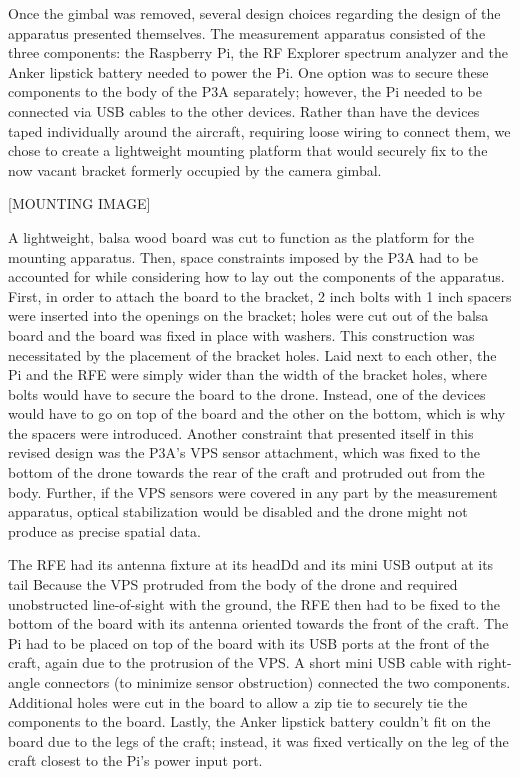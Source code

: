 \documentclass[pageno]{jpaper}
\begin{document}
 Once the gimbal was removed, several design choices regarding the design of the apparatus presented themselves. The measurement apparatus consisted of the three components: the Raspberry Pi, the RF Explorer spectrum analyzer and the Anker lipstick battery needed to power the Pi. One option was to secure these components to the body of the P3A separately; however, the Pi needed to be connected via USB cables to the other devices. Rather than have the devices taped individually around the aircraft, requiring loose wiring to connect them, we chose to create a lightweight mounting platform that would securely fix to the now vacant bracket formerly occupied by the camera gimbal.
 
 [MOUNTING IMAGE]
 
 A lightweight, balsa wood board was cut to function as the platform for the mounting apparatus. Then, space constraints imposed by the P3A had to be accounted for while considering how to lay out the components of the apparatus. First, in order to attach the board to the bracket, 2 inch bolts with 1 inch spacers were inserted into the openings on the bracket; holes were cut out of the balsa board and the board was fixed in place with washers. This construction was necessitated by the placement of the bracket holes. Laid next to each other, the Pi and the RFE were simply wider than the width of the bracket holes, where bolts would have to secure the board to the drone. Instead, one of the devices would have to go on top of the board and the other on the bottom, which is why the spacers were introduced. Another constraint that presented itself in this revised design was the P3A's VPS sensor attachment, which was fixed to the bottom of the drone towards the rear of the craft and protruded out from the body. Further, if the VPS sensors were covered in any part by the measurement apparatus, optical stabilization would be disabled and the drone might not produce as precise spatial data. 
 
 The RFE had its antenna fixture at its headDd and its mini USB output at its tail  Because the VPS protruded from the body of the drone and required unobstructed line-of-sight with the ground, the RFE then had to be fixed to the bottom of the board with its antenna oriented towards the front of the craft. The Pi had to be placed on top of the board with its USB ports at the front of the craft, again due to the protrusion of the VPS. A short mini USB cable with right-angle connectors (to minimize sensor obstruction) connected the two components. Additional holes were cut in the board to allow a zip tie to securely tie the components to the board. Lastly, the Anker lipstick battery couldn't fit on the board due to the legs of the craft; instead, it was fixed vertically on the leg of the craft closest to the Pi's power input port.
 
\end{document}
